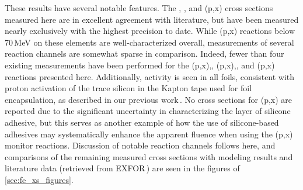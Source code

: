 These results have several notable features.
The 
, , and (p,x) cross sections measured here are in excellent agreement with 
literature,  but have been measured nearly exclusively with the highest precision to date.
While (p,x) reactions below 70\,MeV on these elements are well-characterized overall, measurements of several reaction channels are somewhat sparse in comparison.
Indeed, fewer than four existing measurements have been performed for the (p,x),, (p,x),, and (p,x)
reactions presented here.
Additionally,  activity is seen in all foils, consistent with proton activation of the trace  silicon in the Kapton tape used for foil encapsulation, as described in our previous work\,\cite{Voyles2018a}.
No cross sections for (p,x) are reported due to the significant uncertainty in characterizing the layer of silicone adhesive, but this serves as another example of how the use of silicone-based adhesives may systematically enhance the apparent fluence when using the (p,x) monitor reactions.
Discussion of notable reaction channels follows here, and 
comparisons  of the
remaining measured cross sections 
with modeling results and literature data (retrieved from EXFOR\,\cite{Otuka2014272}) are seen in the figures of 
\ref{sec:fe_xs_figures}.


